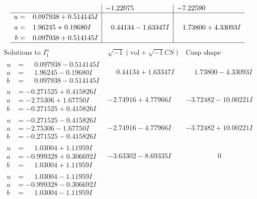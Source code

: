 \documentclass[1p]{elsarticle_modified}
\theoremstyle{definition}
\newcommand{\I}{\sqrt{-1}}
\begin{document}
$$\begin{array}{c|c|c}
 & -1.22075\phantom{ +0.000000I} & -7.22590\phantom{ +0.000000I} \\ \hline\begin{aligned}
u &= \phantom{-}0.097938 + 0.514145 I \\
a &= \phantom{-}1.96245 + 0.19680 I \\
b &= \phantom{-}0.097938 + 0.514145 I\end{aligned}
 & \phantom{-}0.44134 - 1.63347 I & \phantom{-}1.73800 + 4.33093 I\\
 \hline 
 \end{array}$$\newpage$$\begin{array}{c|c|c}  
\text{Solutions to }I^u_{1}& \I (\text{vol} + \sqrt{-1}CS) & \text{Cusp shape}\\
 \hline 
\begin{aligned}
u &= \phantom{-}0.097938 - 0.514145 I \\
a &= \phantom{-}1.96245 - 0.19680 I \\
b &= \phantom{-}0.097938 - 0.514145 I\end{aligned}
 & \phantom{-}0.44134 + 1.63347 I & \phantom{-}1.73800 - 4.33093 I \\ \hline\begin{aligned}
u &= -0.271525 + 0.415826 I \\
a &= -2.75306 + 1.67750 I \\
b &= -0.271525 + 0.415826 I\end{aligned}
 & -2.74916 + 4.77966 I & -3.72482 - 10.00221 I \\ \hline\begin{aligned}
u &= -0.271525 - 0.415826 I \\
a &= -2.75306 - 1.67750 I \\
b &= -0.271525 - 0.415826 I\end{aligned}
 & -2.74916 - 4.77966 I & -3.72482 + 10.00221 I \\ \hline\begin{aligned}
u &= \phantom{-}1.03004 + 1.11959 I \\
a &= -0.999328 + 0.306692 I \\
b &= \phantom{-}1.03004 + 1.11959 I\end{aligned}
 & -3.63302 - 8.69335 I & \phantom{-0.000000 } 0 \\ \hline\begin{aligned}
u &= \phantom{-}1.03004 - 1.11959 I \\
a &= -0.999328 - 0.306692 I \\
b &= \phantom{-}1.03004 - 1.11959 I\end{aligned}

\end{array}$$
\end{document}
